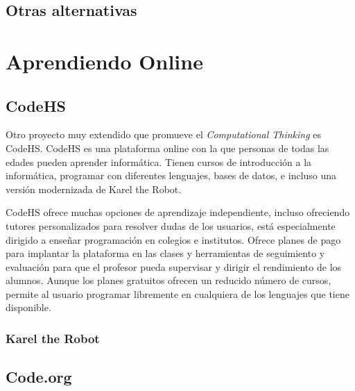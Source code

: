 \subsection{{\color{green}Otras alternativas}}
\label{sec:robot-alternativas}


\section{Aprendiendo Online}
\label{sec:aprendiendo-online}

\subsection{CodeHS}
\label{sec:CodeHS}


Otro proyecto muy extendido que promueve el \emph{Computational Thinking} es CodeHS. CodeHS es una plataforma online con la que personas de todas las edades pueden aprender informática. Tienen cursos de introducción a la informática, programar con diferentes lenguajes, bases de datos, e incluso una versión modernizada de {\color{green}Karel the Robot\cite{pattis1981karel}. }

CodeHS ofrece muchas opciones de aprendizaje independiente, incluso ofreciendo tutores personalizados para resolver dudas de los usuarios, está especialmente dirigido a enseñar programación en colegios e institutos. Ofrece planes de pago para implantar la plataforma en las clases y herramientas de seguimiento y evaluación para que el profesor pueda supervisar y dirigir el rendimiento de los alumnos. Aunque los planes gratuitos ofrecen un reducido número de cursos, permite al usuario programar libremente en cualquiera de los lenguajes que tiene disponible. 

\subsubsection{Karel the Robot}
\label{sec:karel-the-robot}



\subsection{Code.org}
\label{sec:Code.org}



